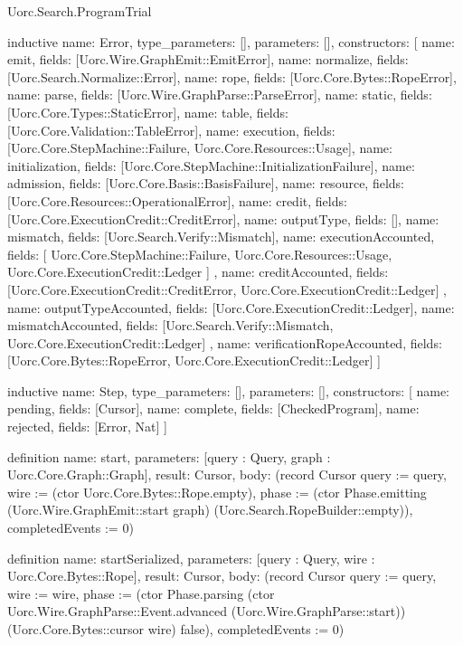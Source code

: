 \begin{lexlean}{Uorc.Search.ProgramTrial}
\begin{semanticmodule}
inductive{
  name: Error,
  type_parameters: [],
  parameters: [],
  constructors: [
    {name: emit, fields: [Uorc.Wire.GraphEmit::EmitError]},
    {name: normalize, fields: [Uorc.Search.Normalize::Error]},
    {name: rope, fields: [Uorc.Core.Bytes::RopeError]},
    {name: parse, fields: [Uorc.Wire.GraphParse::ParseError]},
    {name: static, fields: [Uorc.Core.Types::StaticError]},
    {name: table, fields: [Uorc.Core.Validation::TableError]},
    {name: execution, fields: [Uorc.Core.StepMachine::Failure, Uorc.Core.Resources::Usage]},
    {name: initialization, fields: [Uorc.Core.StepMachine::InitializationFailure]},
    {name: admission, fields: [Uorc.Core.Basis::BasisFailure]},
    {name: resource, fields: [Uorc.Core.Resources::OperationalError]},
    {name: credit, fields: [Uorc.Core.ExecutionCredit::CreditError]},
    {name: outputType, fields: []},
    {name: mismatch, fields: [Uorc.Search.Verify::Mismatch]},
    {
      name: executionAccounted,
      fields: [
        Uorc.Core.StepMachine::Failure,
        Uorc.Core.Resources::Usage,
        Uorc.Core.ExecutionCredit::Ledger
      ]
    },
    {
      name: creditAccounted,
      fields: [Uorc.Core.ExecutionCredit::CreditError, Uorc.Core.ExecutionCredit::Ledger]
    },
    {name: outputTypeAccounted, fields: [Uorc.Core.ExecutionCredit::Ledger]},
    {
      name: mismatchAccounted,
      fields: [Uorc.Search.Verify::Mismatch, Uorc.Core.ExecutionCredit::Ledger]
    },
    {
      name: verificationRopeAccounted,
      fields: [Uorc.Core.Bytes::RopeError, Uorc.Core.ExecutionCredit::Ledger]
    }
  ]
}

inductive{
  name: Step,
  type_parameters: [],
  parameters: [],
  constructors: [
    {name: pending, fields: [Cursor]},
    {name: complete, fields: [CheckedProgram]},
    {name: rejected, fields: [Error, Nat]}
  ]
}

definition{
  name: start,
  parameters: [query : Query, graph : Uorc.Core.Graph::Graph],
  result: Cursor,
  body: (record Cursor {query := query, wire := (ctor Uorc.Core.Bytes::Rope.empty), phase := (ctor Phase.emitting (Uorc.Wire.GraphEmit::start graph) (Uorc.Search.RopeBuilder::empty)), completedEvents := 0})
}

definition{
  name: startSerialized,
  parameters: [query : Query, wire : Uorc.Core.Bytes::Rope],
  result: Cursor,
  body: (record Cursor {query := query, wire := wire, phase := (ctor Phase.parsing (ctor Uorc.Wire.GraphParse::Event.advanced (Uorc.Wire.GraphParse::start)) (Uorc.Core.Bytes::cursor wire) false), completedEvents := 0})
}


\end{semanticmodule}
\end{lexlean}
